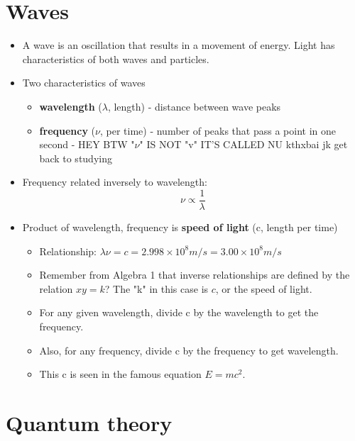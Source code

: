 \documentclass[letterpaper, 12pt]{article}
\begin{document}
\section{Waves}
	\begin{itemize}
		\item A wave is an oscillation that results in a movement of energy. Light has characteristics of both waves and particles.
		\item Two characteristics of waves
		\begin{itemize}
			\item \textbf{wavelength} ($\lambda$, length) - distance between wave peaks
			\item \textbf{frequency} ($\nu$, per time) - number of peaks that pass a point in one second - HEY BTW "$\nu$" IS NOT "v" IT'S CALLED NU kthxbai jk get back to studying
		\end{itemize}
		\item Frequency related inversely to wavelength: $$\nu \propto \frac{1}{\lambda}$$
		\item Product of wavelength, frequency is \textbf{speed of light} (c, length per time)
		\begin{itemize}
			\item Relationship: $\lambda \nu = c = 2.998 \times 10^8 m/s = 3.00 \times 10^8 m/s$
			\item Remember from Algebra 1 that inverse relationships are defined by the relation $xy = k$? The "k" in this case is $c$, or the speed of light.
			\item For any given wavelength, divide c by the wavelength to get the frequency.
			\item Also, for any frequency, divide c by the frequency to get wavelength.
			\item This c is seen in the famous equation $E = mc^2$.
		\end{itemize}
	\end{itemize}
\section{Quantum theory}
\end{document}
